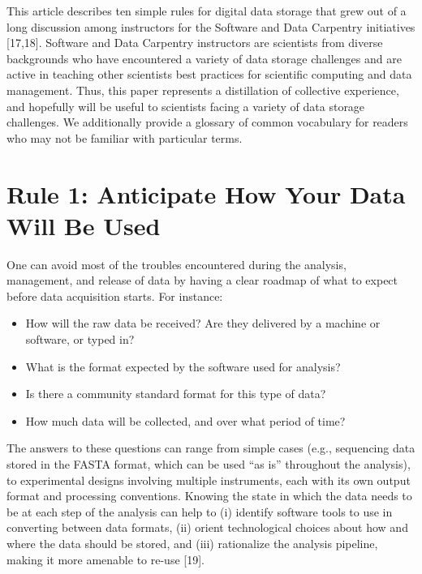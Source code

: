 \documentclass[10pt,letterpaper]{article}
\providecommand{\tightlist}{%
  \setlength{\itemsep}{0pt}\setlength{\parskip}{0pt}
}
\begin{document}
This article describes ten simple rules for digital data storage that
grew out of a long discussion among instructors for the Software and
Data Carpentry initiatives {[}17,18{]}. Software and Data Carpentry
instructors are scientists from diverse backgrounds who have encountered
a variety of data storage challenges and are active in teaching other
scientists best practices for scientific computing and data management.
Thus, this paper represents a distillation of collective experience, and
hopefully will be useful to scientists facing a variety of data storage
challenges. We additionally provide a glossary of common vocabulary for
readers who may not be familiar with particular terms.

\section*{Rule 1: Anticipate How Your Data Will Be
Used}\label{rule-1-anticipate-how-your-data-will-be-used}

One can avoid most of the troubles encountered during the analysis,
management, and release of data by having a clear roadmap of what to
expect before data acquisition starts. For instance:

\begin{itemize}
\tightlist
\item
  How will the raw data be received? Are they delivered by a machine or
  software, or typed in?
\item
  What is the format expected by the software used for analysis?
\item
  Is there a community standard format for this type of data?
\item
  How much data will be collected, and over what period of time?
\end{itemize}

The answers to these questions can range from simple cases (e.g.,
sequencing data stored in the FASTA format, which can be used ``as is''
throughout the analysis), to experimental designs involving multiple
instruments, each with its own output format and processing conventions.
Knowing the state in which the data needs to be at each step of the
analysis can help to (i) identify software tools to use in converting
between data formats, (ii) orient technological choices about how and
where the data should be stored, and (iii) rationalize the analysis
pipeline, making it more amenable to re-use {[}19{]}.
\end{document}
